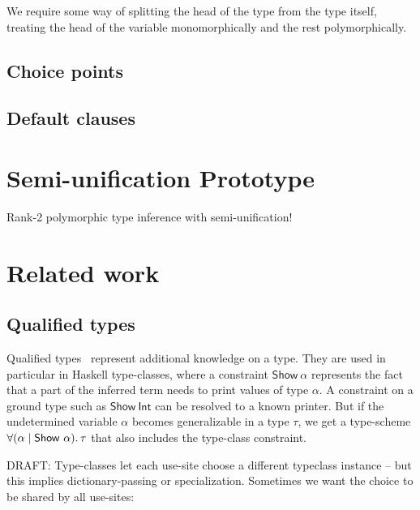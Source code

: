 \documentclass[acmsmall,screen,nonacm]{acmart}
\begin{document}
We require some way of splitting the head of the type from the type itself,
treating the head of the variable monomorphically and the rest
polymorphically.


\subsection{Choice points}

\subsection{Default clauses}


\section{Semi-unification Prototype}

Rank-2 polymorphic type inference with semi-unification!


\section{Related work}
\label{sec:related-work}

\subsection{Qualified types}


Qualified types~\citep*{TODO} represent additional knowledge on a type. They
are used in particular in Haskell type-classes, where a constraint
$\mathsf{Show}~\alpha$ represents the fact that a part of the inferred term
needs to print values of type $\alpha$. A constraint on a ground type such
as $\mathsf{Show}~\mathsf{Int}$ can be resolved to a known printer. But if
the undetermined variable $\alpha$ becomes generalizable in a type $\tau$,
we get a type-scheme $\forall {(\alpha \mid \mathsf{Show}~\alpha)}.\,{\tau}$ that
also includes the type-class constraint.

DRAFT: Type-classes let each use-site choose a different typeclass instance
-- but this implies dictionary-passing or specialization. Sometimes we want
the choice to be shared by all use-sites:
\end{document}
